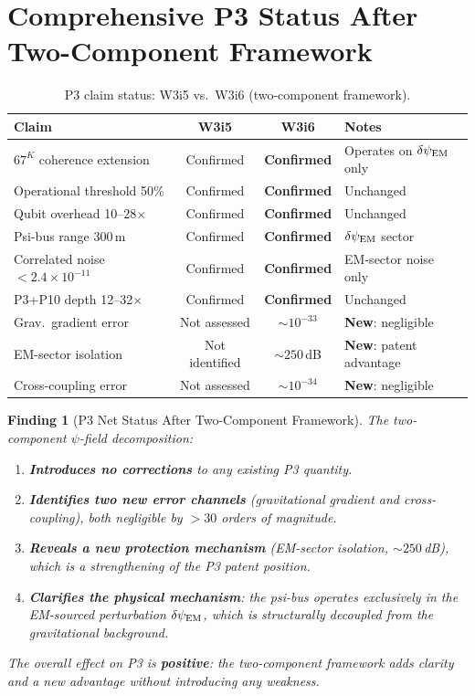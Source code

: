 \documentclass[11pt]{article}
\newtheorem{finding}[theorem]{Finding}
\theoremstyle{definition}
\theoremstyle{remark}
\newcommand{\ee}[1]{\times 10^{#1}}
\newcommand{\dpsiEM}{\delta\psi_{\rm EM}}
\begin{document}
\section{Comprehensive P3 Status After Two-Component Framework}
\label{sec:p3-status}

\begin{table}[h]
\centering
\caption{P3 claim status: W3i5 vs.\ W3i6 (two-component framework).}
\label{tab:p3-status}
\begin{tabular}{@{}p{4.5cm}ccp{4cm}@{}}
\toprule
Claim & W3i5 & W3i6 & Notes \\
\midrule
$67^K$ coherence extension & Confirmed & \textbf{Confirmed} & Operates on
  $\dpsiEM$ only \\
Operational threshold 50\% & Confirmed & \textbf{Confirmed} & Unchanged \\
Qubit overhead 10--28$\times$ & Confirmed & \textbf{Confirmed} & Unchanged \\
Psi-bus range 300\,m & Confirmed & \textbf{Confirmed} & $\dpsiEM$ sector \\
Correlated noise $< 2.4\ee{-11}$ & Confirmed & \textbf{Confirmed} &
  EM-sector noise only \\
P3+P10 depth 12--32$\times$ & Confirmed & \textbf{Confirmed} & Unchanged \\
Grav.\ gradient error & Not assessed & $\sim 10^{-33}$ &
  \textbf{New}: negligible \\
EM-sector isolation & Not identified & $\sim 250$\,dB &
  \textbf{New}: patent advantage \\
Cross-coupling error & Not assessed & $\sim 10^{-34}$ &
  \textbf{New}: negligible \\
\bottomrule
\end{tabular}
\end{table}

\begin{finding}[P3 Net Status After Two-Component Framework]
\label{finding:p3-net-status}
The two-component $\psi$-field decomposition:
\begin{enumerate}
  \item \textbf{Introduces no corrections} to any existing P3 quantity.
  \item \textbf{Identifies two new error channels} (gravitational gradient
    and cross-coupling), both negligible by $>30$ orders of magnitude.
  \item \textbf{Reveals a new protection mechanism} (EM-sector isolation,
    $\sim 250$\,dB), which is a \emph{strengthening} of the P3 patent
    position.
  \item \textbf{Clarifies the physical mechanism}: the psi-bus operates
    exclusively in the EM-sourced perturbation $\dpsiEM$, which is
    structurally decoupled from the gravitational background.
\end{enumerate}
The overall effect on P3 is \textbf{positive}: the two-component framework
adds clarity and a new advantage without introducing any weakness.
\end{finding}
\end{document}
